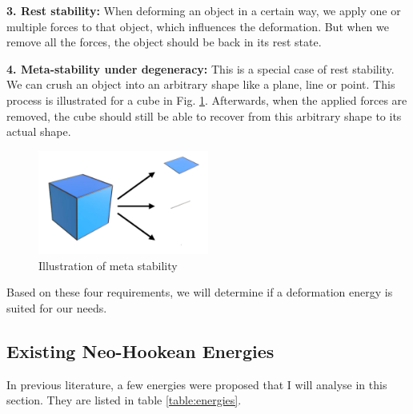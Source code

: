 \textbf{3. Rest stability:} When deforming an object in a certain way, we apply one or multiple forces to that object, which influences the deformation. But when we remove all the forces, the object should be back in its rest state.

\textbf{4. Meta-stability under degeneracy:} This is a special case of rest stability. We can crush an object into an arbitrary shape like a plane, line or point. This process is illustrated for a cube in Fig. \ref{fig:meta_stability}. Afterwards, when the applied forces are removed, the cube should still be able to recover from this arbitrary shape to its actual shape.

\begin{figure}[!htbp]
	\centering
	\includegraphics[width=0.5\textwidth]{resources/meta_stability}
	\caption[Illustration of meta stability]{Illustration of meta stability {\cite{STREAM2018}}}
	\label{fig:meta_stability}
\end{figure}

Based on these four requirements, we will determine if a deformation energy is suited for our needs.



\subsection{Existing Neo-Hookean Energies}

In previous literature, a few energies were proposed that I will analyse in this section. They are listed in table \ref{table:energies}.

